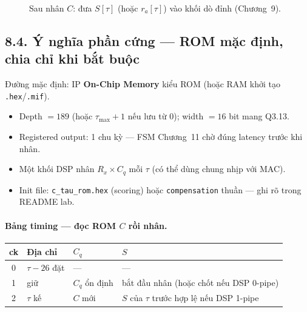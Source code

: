\begin{figure}[H]
\centering
{}
\caption{Sau nhân $C$: đưa $S[\tau]$ (hoặc $r_a[\tau]$) vào khối dò đỉnh (Chương~9).}
\label{fig:ch08_norm_datapath}
\end{figure}

\subsection*{8.4. Ý nghĩa phần cứng --- ROM mặc định, chia chỉ khi bắt buộc}

Đường mặc định: IP \textbf{On-Chip Memory} kiểu ROM (hoặc RAM khởi tạo \texttt{.hex}/\texttt{.mif}).

\begin{itemize}[leftmargin=1.4em]
\item Depth $= 189$ (hoặc $\tau_{\max}+1$ nếu lưu từ 0); width $= 16$ bit mang Q3.13.
\item Registered output: 1 chu kỳ --- FSM Chương~11 chờ đúng latency trước khi nhân.
\item Một khối DSP nhân $R_x\times C_q$ mỗi $\tau$ (có thể dùng chung nhịp với MAC).
\item Init file: \texttt{c\_tau\_rom.hex} (scoring) hoặc \texttt{compensation} thuần --- ghi rõ trong README lab.
\end{itemize}

\paragraph{Bảng timing --- đọc ROM $C$ rồi nhân.}
\begin{center}\small
\begin{tabular}{@{}clll@{}}\toprule
ck & Địa chỉ & $C_q$ & $S$ \\
\midrule
0 & $\tau-26$ đặt & --- & --- \\
1 & giữ & $C_q$ ổn định & bắt đầu nhân (hoặc chốt nếu DSP 0-pipe) \\
2 & $\tau$ kế & $C$ mới & $S$ của $\tau$ trước hợp lệ nếu DSP 1-pipe \\
\bottomrule
\end{tabular}
\end{center}

